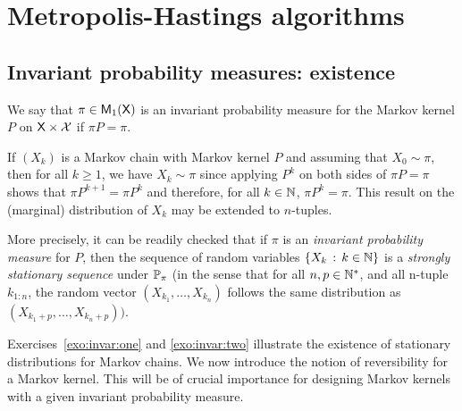 \documentclass[english,graybox,envcountchap,envcountsame,sectrefs,shortlabels]{svmono}
\theoremstyle{style}
\renewenvironment{keywords}{\textit{\bf Keywords: } \sffamily }{}
\begin{document}
\chapter{Metropolis-Hastings algorithms}
\minitoc
\section{Invariant probability measures: existence}
\begin{definition}
We say that $\pi\in\mathsf{M}_{1}(\mathsf{X})$ is an invariant probability measure
for the Markov kernel $P$ on $\mathsf{X}\times\mathcal{X}$ if $\pi P=\pi$.
\end{definition}

If $(X_{k})$ is a Markov chain with Markov kernel $P$
and assuming that $X_{0}\sim\pi$, then for all $k\geq1$, we have
$X_{k}\sim\pi$ since applying $P^{k}$ on
both sides of $\pi P=\pi$ shows that $\pi P^{k+1}=\pi P^{k}$ and
therefore, for all $k\in\mathbb{N}$, $\pi P^{k}=\pi$. This result on
the (marginal) distribution of $X_{k}$ may be extended to $n$-tuples.

More precisely, it can be readily checked that if $\pi$ is an \emph{invariant
probability measure }for $P$, then the sequence of random variables
$\left\{ X_{k}\,:\,k\in\mathbb{N}\right\}$ is a \emph{strongly stationary sequence}
under $\mathbb{P}_{\pi}$ (in the sense that for all $n,p\in\mathbb{N}^{*}$,
and all n-tuple $k_{1:n}$, the random vector $(X_{k_{1}},\ldots,X_{k_{n}})$
follows the same distribution as $(X_{k_{1}+p},\ldots,X_{k_{n}+p}))$.

Exercises~\ref{exo:invar:one} and \ref{exo:invar:two} illustrate the existence of stationary distributions for Markov chains.
We now introduce the notion of reversibility for a Markov kernel.
This will be of crucial importance for designing Markov kernels with
a given invariant probability measure.
\end{document}
